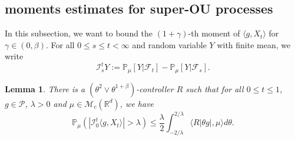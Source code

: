 \documentclass[12pt,a4paper]{amsart}
\theoremstyle{plain}
\newtheorem{lem}[thm]{Lemma}
\theoremstyle{definition}
\numberwithin{equation}{section}
\begin{document}
\subsection{moments estimates  for super-OU processes}

 In this subsection,  we want to bound the $(1+\gamma)$-th moment of $\langle g ,X_t \rangle$ for $\gamma \in (0,\beta)$.
    For all $0 \leq s \leq t <\infty$ and  random variable $Y$ with finite mean, we write
\begin{equation}\label{Ist}
    \mathcal I_s^t Y
  := \mathbb P_\mu[Y|\mathscr F_t] - \mathbb P_\mu[Y|\mathscr F_s].
\end{equation}

\begin{lem}
\label{lem: control pair for P(M>lambda)}
    There is a $(\theta^2\vee\theta^{1+\beta})$-controller $R$ such that for all $0\leq t\leq 1$, $g\in \mathcal P$, $\lambda >0$ and $\mu\in \mathcal M_c(\mathbb R^d)$, we have
\[
    \mathbb P_\mu ( |\mathcal{I}_0^t\langle g,X_t\rangle| > \lambda)
    \leq \frac{\lambda}{2}\int_{-2/\lambda}^{2/\lambda}\langle R|\theta g|,\mu\rangle d\theta.
\]
\end{lem}
\end{document}
